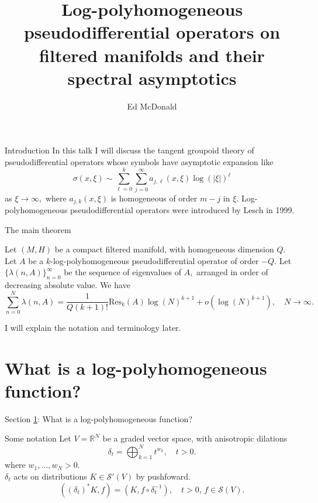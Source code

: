 \documentclass{beamer}
\newcommand\makebeamertitle{\frame{\maketitle}}%
\numberwithin{equation}{section}
\theoremstyle{plain}
\theoremstyle{plain}
\theoremstyle{definition}
\theoremstyle{plain}
\theoremstyle{plain}
\theoremstyle{definition}
\newcommand{\Rl}{\mathbb{R}}
\newcommand{\Sc}{\mathcal{S}}
\newcommand{\Res}{\mathrm{Res}}
\begin{document}
\title[Log-polyhoomogeneous $\psi$DO]{Log-polyhomogeneous pseudodifferential operators on filtered manifolds and their spectral asymptotics}


\author[E. McDonald]{Ed McDonald}



\makebeamertitle

\begin{frame}{Introduction}
    In this talk I will discuss the tangent groupoid theory of pseudodifferential operators whose symbols have asymptotic expansion like
    \[
        \sigma(x,\xi) \sim \sum_{\ell=0}^k \sum_{j=0}^{\infty} a_{j,\ell}(x,\xi)\log(|\xi|)^\ell
    \]
    as $\xi\to \infty,$ where $a_{j,k}(x,\xi)$ is homogeneous of order $m-j$ in $\xi.$
    \pause
    Log-polyhomogeneous pseudodifferential operators were introduced by Lesch in 1999.
\end{frame}

\begin{frame}{The main theorem}
    \begin{theorem}
        Let $(M,H)$ be a compact filtered manifold, with homogeneous dimension $Q.$ Let $A$ be a $k$-log-polyhomogeneous pseudodifferential operator of order $-Q.$ Let $\{\lambda(n,A)\}_{n=0}^\infty$ be the sequence of eigenvalues of $A,$ arranged in order of decreasing absolute value. We have
        \[
            \sum_{n=0}^N \lambda(n,A) = \frac{1}{Q(k+1)!}\Res_k(A)\log(N)^{k+1} + o(\log(N)^{k+1}),\quad N\to\infty.
        \]
    \end{theorem}
    I will explain the notation and terminology later.
\end{frame}

\section{What is a log-polyhomogeneous function?}\label{log_poly_section}

\begin{frame}
    \huge{Section \ref{log_poly_section}: What is a log-polyhomogeneous function?}
\end{frame}

\begin{frame}{Some notation}
    Let $V=\Rl^N$ be a graded vector space, with anisotropic dilations
    \[
        \delta_t = \bigoplus_{k=1}^N t^{w_k},\quad t > 0.
    \]
    where $w_1,\ldots,w_N>0.$\\\pause
    $\delta_t$ acts on distributions $K\in \Sc'(V)$ by pushfoward.
    \[
        ((\delta_t)^*K,f) = (K,f\circ \delta_{t}^{-1}),\quad t>0,\, f \in \Sc(V).
    \]
\end{frame}
\end{document}
